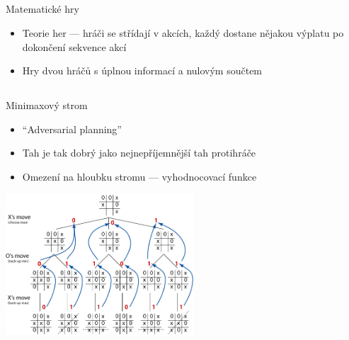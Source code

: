 \documentclass{beamer}
\begin{document}
\subsection{}
\begin{frame}{Matematické hry}
\begin{itemize}
\item Teorie her --- hráči se střídají v akcích, každý dostane nějakou výplatu po dokončení sekvence akcí
\item Hry dvou hráčů s úplnou informací a nulovým součtem
\end{itemize}
\end{frame}

\subsection{}
\begin{frame}{Minimaxový strom}
\begin{itemize}
\item ``Adversarial planning''
\item Tah je tak dobrý jako nejnepříjemnější tah protihráče
\item Omezení na hloubku stromu --- vyhodnocovací funkce
\end{itemize}
\begin{center}
\includegraphics[width=7cm]{minimax-illustration.jpg}
\end{center}
\end{frame}
\end{document}
